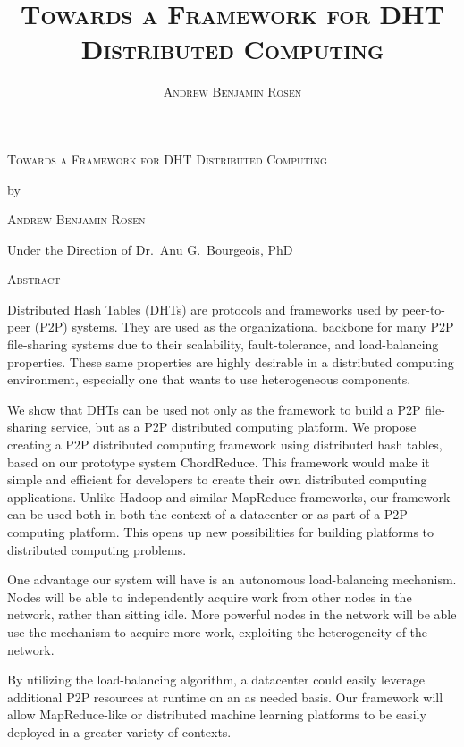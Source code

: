 \documentclass[11pt,letterpaper]{report}
\title{\textsc{Towards a Framework for DHT Distributed Computing}}
\author{\textsc{Andrew Benjamin Rosen}}
\date{}
\begin{document}
	
	

	\pagestyle{empty}

	\begin{center}
		{\scshape Towards a Framework for DHT Distributed Computing\par}
		\vspace{0.5cm}
		{by\par}
		\vspace{0.5cm}
		{\scshape Andrew Benjamin Rosen\par}
		\vspace{0.5cm}
		{Under the Direction of Dr.~Anu G.~Bourgeois, PhD \par}
		\vspace{0.5cm}
		{\scshape Abstract \par}
		
	\end{center}
	
	
		Distributed Hash Tables (DHTs) are protocols and frameworks used by peer-to-peer (P2P) systems.
		They are used as the organizational backbone for many P2P file-sharing systems due to their scalability, fault-tolerance, and load-balancing properties.
		These same properties are highly desirable in a distributed computing environment, especially one that wants to use heterogeneous components.
		
		We show that DHTs can be used not only as the framework to build a P2P file-sharing service, but as a P2P distributed computing platform.
		We propose creating a P2P distributed computing framework using distributed hash tables, based on our prototype system ChordReduce.
		This framework would make it simple and efficient for developers to create their own distributed computing applications.
		Unlike Hadoop and similar MapReduce frameworks, our framework can be used both in both the context of a datacenter or as part of a P2P computing platform.  
		This opens up new possibilities for building platforms to distributed computing problems.
		
		One advantage our system will have is an autonomous load-balancing mechanism.
		Nodes will be able to independently acquire work from other nodes in the network, rather than sitting idle.
		More powerful nodes in the network will be able use the mechanism to acquire more work, exploiting the heterogeneity of the network.
		
		By utilizing the load-balancing algorithm, a datacenter could easily leverage additional P2P resources at runtime on an as needed basis.
		Our framework will allow MapReduce-like or distributed machine learning platforms to be easily deployed in a greater variety of contexts.
		
\end{document}
